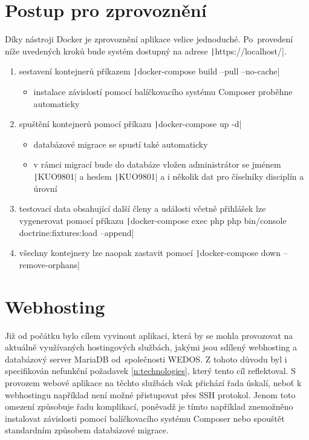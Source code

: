 \section{Postup pro zprovoznění}\label{deploy-steps}
Díky nástroji Docker je zprovoznění aplikace velice jednoduché. Po~provedení níže uvedených kroků bude systém dostupný na adrese \texttt|https://localhost/|.

\begin{enumerate}
	\item sestavení kontejnerů příkazem \texttt|docker-compose build --pull --no-cache|
	\begin{itemize}[topsep=0pt]
		\item instalace závislostí pomocí balíčkovacího systému Composer proběhne automaticky
	\end{itemize}
	\item spuštění kontejnerů pomocí příkazu \texttt|docker-compose up -d|
	\begin{itemize}[topsep=0pt]
		\item databázové migrace se spustí také automaticky
		\item v rámci migrací bude do databáze vložen administrátor se jménem \texttt|KUO9801| a heslem \texttt|KUO9801| a i několik dat pro číselníky disciplín a úrovní
	\end{itemize}
	\item testovací data obsahující další členy a události včetně přihlášek lze vygenerovat pomocí příkazu \texttt|docker-compose exec php php bin/console doctrine:fixtures:load --append|
	\item všechny kontejnery lze naopak zastavit pomocí \texttt|docker-compose down --remove-orphans|
\end{enumerate}

\section{Webhosting}
Již od počátku bylo cílem vyvinout aplikaci, která by se mohla provozovat na aktuálně využívaných hostingových službách, jakými jsou sdílený webhosting a databázový server MariaDB od~společnosti WEDOS. Z tohoto důvodu byl i specifikován nefunkční požadavek \ref{n:technologies}, který tento cíl reflektoval. S provozem webové aplikace na těchto službách však přichází řada úskalí, neboť k webhostingu například není možné přistupovat přes SSH protokol. Jenom toto omezení způsobuje řadu komplikací, poněvadž je tímto například znemožněno instalovat závislosti pomocí balíčkovacího systému Composer nebo spouštět standardním způsobem databázové migrace.

